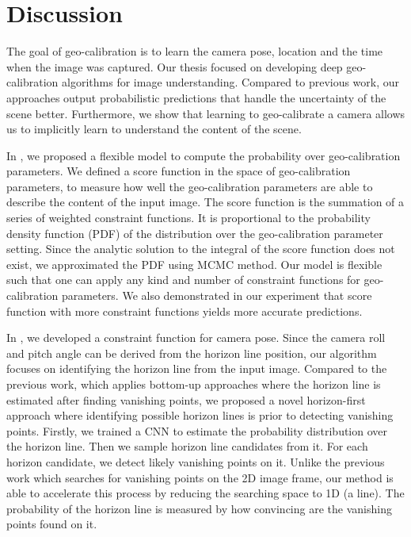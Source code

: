 \chapter{Discussion}
\label{chap:discussion}

The goal of geo-calibration is to learn the camera pose, location and
the time when the image was captured.
Our thesis focused on developing deep geo-calibration algorithms for
image understanding.
Compared to previous work, our approaches output probabilistic
predictions that handle the uncertainty of the scene
better. Furthermore, we show that
learning to geo-calibrate a camera allows us to implicitly learn to
understand the content of the scene.


In , we proposed a flexible model to compute the
probability over geo-calibration parameters. We defined a score
function in the space of geo-calibration parameters, to measure how
well the geo-calibration parameters are able to describe the content
of the input image.
The score function is the summation of a series of weighted
constraint functions. It is proportional to the probability density
function (PDF) of the distribution over the geo-calibration parameter setting.
Since the analytic solution to the
integral of the score function does not exist, we approximated the
PDF using MCMC method. Our model is flexible such that one can apply
any kind and number of constraint functions for geo-calibration
parameters. We also demonstrated in our experiment that 
score function with more constraint functions yields more accurate
predictions.

In , we developed a constraint function for
camera pose. Since the camera roll and pitch angle can be derived from
the horizon line position, our algorithm focuses on identifying the
horizon line from the input image.
Compared to the previous work, which applies bottom-up
approaches where the horizon line is estimated after finding vanishing
points, we proposed a novel horizon-first approach where
identifying possible horizon lines is prior to detecting vanishing
points. 
Firstly, we trained a CNN to estimate the probability distribution
over the horizon line. Then we sample horizon line candidates from
it. For each horizon candidate, we detect likely
vanishing points on it. Unlike the previous work which searches for
vanishing points on the 2D image frame, our method is able to
accelerate this process by reducing the searching space to
1D (a line). The probability of the horizon line is measured by how
convincing are the vanishing points found on it. 

